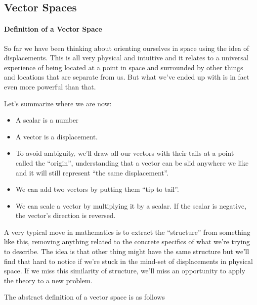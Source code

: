 \documentclass[oneside,english]{amsbook}
\numberwithin{section}{chapter}
\theoremstyle{plain}
\theoremstyle{definition}
\begin{document}
\subsection{Vector Spaces}

\paragraph{Definition of a Vector Space}

So far we have been thinking about orienting ourselves in space using
the idea of displacements. This is all very physical and intuitive and
it relates to a universal experience of being located at a point in
space and surrounded by other things and locations that are separate
from us. But what we've ended up with is in fact even more powerful than
that.

Let's summarize where we are now:

\begin{itemize}
	\item
	A scalar is a number
	\item
	A vector is a displacement.
	\item
	To avoid ambiguity, we'll draw all our vectors with their tails at a
	point called the ``origin'', understanding that a vector can be slid
	anywhere we like and it will still represent ``the same
	displacement''.
	\item
	We can add two vectors by putting them ``tip to tail''.
	\item
	We can scale a vector by multiplying it by a scalar. If the scalar is
	negative, the vector's direction is reversed.
\end{itemize}

A very typical move in mathematics is to extract the ``structure'' from
something like this, removing anything related to the concrete specifics
of what we're trying to describe. The idea is that other thing might
have the same structure but we'll find that hard to notice if we're
stuck in the mind-set of displacements in physical space. If we miss
this similarity of structure, we'll miss an opportunity to apply the
theory to a new problem.

The abstract definition of a vector space is as follows
\end{document}
